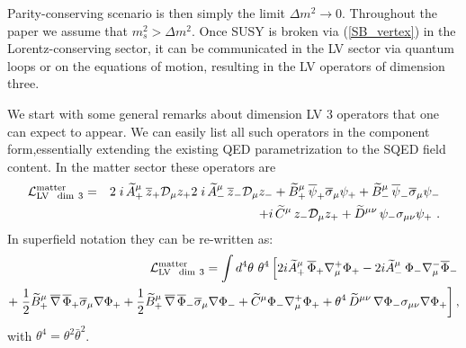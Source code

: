 \documentclass[12pt]{revtex4}
\begin{document}
	Parity-conserving scenario is then simply the limit
	$ \Delta m^2 \to 0 $. Throughout the paper we assume that 
	$m_s^2>\Delta m^2$. 
Once SUSY is broken via (\ref{SB_vertex}) in the Lorentz-conserving sector, 
it can be communicated in the LV sector via quantum loops or on the equations of motion, resulting 
in the LV operators of dimension three. 

We start with some general remarks about dimension LV 3 operators 
that one can expect to appear. We can easily list all such operators in 
the component form,essentially extending the existing QED parametrization \cite{Kost1} 
to the SQED field content. In the matter sector these operators are
\begin{eqnarray}
{\cal L}_{\rm LV ~ ~dim~3}^{\rm matter} = 
&& 2\;i\, \widetilde{A}_+^\mu\, \overline{z}_+ 
\mathcal{D}_\mu z_+ 2\;i\, \widetilde{A}_-^\mu\, \overline{z}_-
\mathcal{D}_\mu z_- 
\label{LV_dim3_comp}
+\widetilde{B}_+^\mu\, \overline{\psi}_+\overline{\sigma}_\mu \psi_+ 
+ \widetilde{B}_-^\mu\, \overline{\psi}_-\overline{\sigma}_\mu \psi_-\\
\nonumber
&& +i\, \widetilde{C}^\mu\, z_- \mathcal{D}_\mu z_+ 
 +\widetilde{D}^{\mu\nu}\, \psi_- \sigma_{\mu\nu} 
     \psi_+~.
\end{eqnarray}
In superfield notation they can be re-written as:
\begin{eqnarray}
{\cal L}_{\rm LV ~ ~dim~3}^{\rm matter} = \int d^4\theta~ \theta^4\left[
2i  \widetilde{A}_+^\mu\, 
\overline{\Phi}_+ \nabla^+_\mu \Phi_+
-
2i \widetilde{A}_-^\mu\, \Phi_- 
                        \nabla^-_\mu 
    \overline{\Phi}_-  \right.\nonumber\\
\label{LV_dim3}+
\left.
\frac{1}{2}
\widetilde{B}_+^\mu\, 
\overline{\nabla}\, \overline{\Phi}_+ \overline{\sigma}_\mu \nabla \Phi_+
+\frac{1}{2}\widetilde{B}_+^\mu\, 
\overline{\nabla}\, \overline{\Phi}_- \overline{\sigma}_\mu \nabla \Phi_- +
\widetilde{C}^\mu
\Phi_- \nabla_\mu^+ \Phi_+ +\theta^4\, \widetilde{D}^{\mu\nu}\,
\nabla \Phi_- \sigma_{\mu\nu} \nabla \Phi_+\right], 
\end{eqnarray}
with $\theta^4 = \theta^2 \bar\theta^2$.
\end{document}
